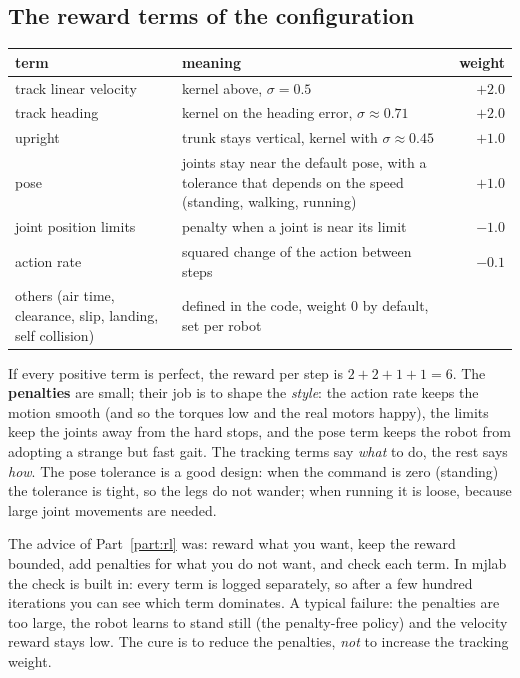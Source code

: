 \subsection*{The reward terms of the configuration}
\begin{center}
\small
\begin{tabular}{p{3.3cm}p{7.2cm}r}
\hline
term & meaning & weight\\
\hline
track linear velocity & kernel above, $\sigma=0.5$ & $+2.0$\\
track heading & kernel on the heading error, $\sigma\approx0.71$ & $+2.0$\\
upright & trunk stays vertical, kernel with $\sigma\approx0.45$ & $+1.0$\\
pose & joints stay near the default pose, with a tolerance that depends on the speed (standing, walking, running) & $+1.0$\\
joint position limits & penalty when a joint is near its limit & $-1.0$\\
action rate & squared change of the action between steps & $-0.1$\\
others (air time, clearance, slip, landing, self collision) & defined in the code, weight $0$ by default, set per robot & \\
\hline
\end{tabular}
\end{center}
If every positive term is perfect, the reward per step is $2+2+1+1=6$. The \textbf{penalties} are small; their job is to shape the \emph{style}: the action rate keeps the motion smooth (and so the torques low and the real motors happy), the limits keep the joints away from the hard stops, and the pose term keeps the robot from adopting a strange but fast gait. The tracking terms say \emph{what} to do, the rest says \emph{how}. The pose tolerance is a good design: when the command is zero (standing) the tolerance is tight, so the legs do not wander; when running it is loose, because large joint movements are needed.

\begin{aibox}
The advice of Part~\ref{part:rl} was: reward what you want, keep the reward bounded, add penalties for what you do not want, and check each term. In mjlab the check is built in: every term is logged separately, so after a few hundred iterations you can see which term dominates. A typical failure: the penalties are too large, the robot learns to stand still (the penalty-free policy) and the velocity reward stays low. The cure is to reduce the penalties, \emph{not} to increase the tracking weight.
\end{aibox}

